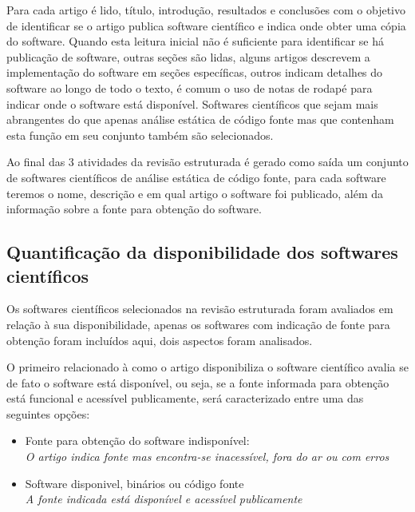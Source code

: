 \begin{description}
    Para cada artigo é lido, título, introdução, resultados
    e conclusões com o objetivo de identificar se o artigo publica software
    científico e indica onde obter uma cópia do software. Quando esta leitura inicial
    não é suficiente para identificar se há publicação de software, outras seções são
    lidas, alguns artigos descrevem a implementação do software em seções específicas,
    outros indicam detalhes do software ao longo de todo o texto, é comum o uso
    de notas de rodapé para indicar onde o software está disponível. Softwares científicos
    que sejam mais abrangentes do que apenas análise estática de código fonte
    mas que contenham esta função em seu conjunto também são selecionados.

\end{description}

Ao final das 3 atividades da revisão estruturada é gerado como saída um
conjunto de softwares científicos de análise estática de código fonte, para
cada software teremos o nome, descrição e em qual artigo o software foi
publicado, além da informação sobre a fonte para obtenção do software.

\subsection{Quantificação da disponibilidade dos softwares científicos}

Os softwares científicos selecionados na revisão estruturada foram avaliados em
relação à sua disponibilidade, apenas os softwares com indicação de fonte para
obtenção foram incluídos aqui, dois aspectos foram analisados.

O primeiro relacionado à como o artigo disponibiliza o software científico
avalia se de fato o software está disponível, ou seja, se a fonte informada
para obtenção está funcional e acessível publicamente, será caracterizado entre
uma das seguintes opções:

\begin{itemize}
  \item Fonte para obtenção do software indisponível:\\
    {\it O artigo indica fonte mas encontra-se inacessível, fora do ar ou com erros}
  \item Software disponivel, binários ou código fonte\\
    {\it A fonte indicada está disponível e acessível publicamente}
\end{itemize}

